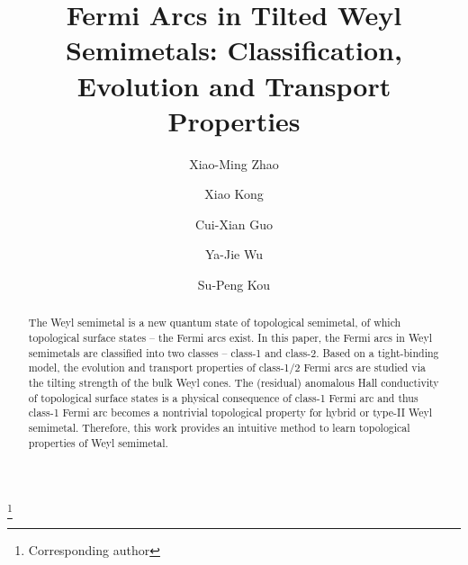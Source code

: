 \documentclass[twocolumn,superscriptaddress]{revtex4}%
\begin{document}
\title{Fermi Arcs in Tilted Weyl Semimetals: Classification, Evolution and Transport Properties}
\author{Xiao-Ming Zhao}
\author{Xiao Kong}
\author{Cui-Xian Guo}
\author{Ya-Jie Wu}
\author{Su-Peng Kou}
\thanks{Corresponding author}

\begin{abstract}
The Weyl semimetal is a new quantum state of topological semimetal, of which
topological surface states -- the Fermi arcs exist. In this paper, the Fermi
arcs in Weyl semimetals are classified into two classes -- class-1 and class-2.
Based on a tight-binding model, the evolution and transport properties of
class-1/2 Fermi arcs are studied via the tilting strength of the bulk Weyl cones.
The (residual) anomalous Hall conductivity of topological surface states is a
physical consequence of class-1 Fermi arc and thus class-1 Fermi arc becomes a
nontrivial topological property for hybrid or type-II Weyl semimetal.
Therefore, this work provides an intuitive method to learn topological
properties of Weyl semimetal.

\end{abstract}
\maketitle
\end{document}
